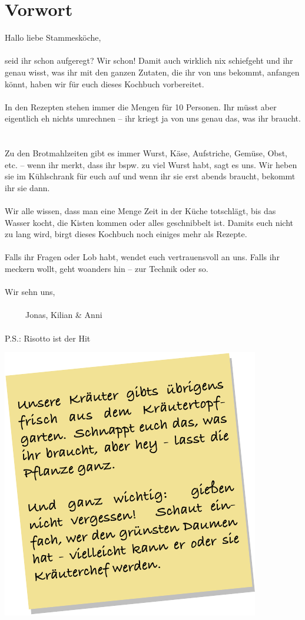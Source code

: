 \section{Vorwort}

Hallo liebe Stammesköche,~\\
~\\
seid ihr schon aufgeregt? Wir schon! Damit auch wirklich nix schiefgeht und ihr genau wisst, was ihr mit den ganzen Zutaten, die ihr von uns bekommt, anfangen könnt, haben wir für euch dieses Kochbuch vorbereitet.\\
~\\
In den Rezepten stehen immer die Mengen für 10 Personen. Ihr müsst aber eigentlich eh nichts umrechnen – ihr kriegt ja von uns genau das, was ihr braucht. ~\\
~\\
Zu den Brotmahlzeiten gibt es immer Wurst, Käse, Aufstriche, Gemüse, Obst, etc. – wenn ihr merkt, dass ihr bspw. zu viel Wurst habt, sagt es uns. Wir heben sie im Kühlschrank für euch auf und wenn ihr sie erst abends braucht, bekommt ihr sie dann. ~\\
~\\
Wir alle wissen, dass man eine Menge Zeit in der Küche totschlägt, bis das Wasser kocht, die Kisten kommen oder alles geschnibbelt ist. Damits euch nicht zu lang wird, birgt dieses Kochbuch noch einiges mehr als Rezepte.~\\
~\\
Falls ihr Fragen oder Lob habt, wendet euch vertrauensvoll an uns. Falls ihr meckern wollt, geht woanders hin – zur Technik oder so.~\\
~\\
Wir sehn uns,~\\
~\\
~~~~~Jonas, Kilian \& Anni~\\
~\\
P.S.: Risotto ist der Hit

\includegraphics[right]{note-crop.pdf}